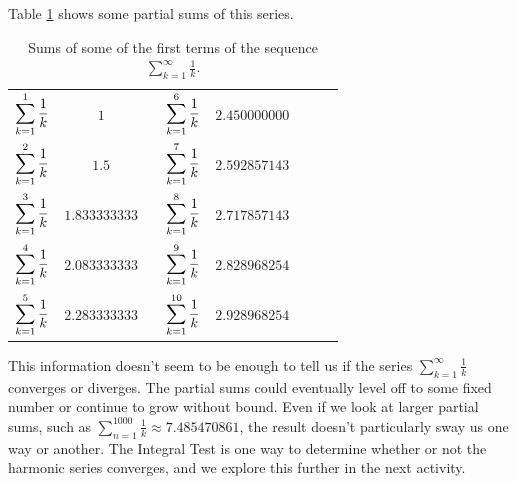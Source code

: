 Table \ref{T:8.3_harmonic} shows some partial sums of this series.
\begin{table}[ht]
\begin{center}
\renewcommand{\arraystretch}{1.5}
\begin{tabular}{c|c p{0.75in} c|c c c|c}
$\displaystyle \sum_{k=1}^{1} \frac{1}{k}$   & $1$                &  &$\displaystyle \sum_{k=1}^{6} \frac{1}{k}$   & $2.450000000$ \\
$\displaystyle \sum_{k=1}^{2} \frac{1}{k}$   & $1.5$              &  &$\displaystyle \sum_{k=1}^{7} \frac{1}{k}$   & $2.592857143$ \\
$\displaystyle \sum_{k=1}^{3} \frac{1}{k}$   & $1.833333333$      &  &$\displaystyle \sum_{k=1}^{8} \frac{1}{k}$   & $2.717857143$ \\
$\displaystyle \sum_{k=1}^{4} \frac{1}{k}$   & $2.083333333$      &  &$\displaystyle \sum_{k=1}^{9} \frac{1}{k}$   & $2.828968254$ \\
$\displaystyle \sum_{k=1}^{5} \frac{1}{k}$   & $2.283333333$      &  &$\displaystyle \sum_{k=1}^{10} \frac{1}{k}$  & $2.928968254$ \\
\end{tabular}
\label{T:8.3_harmonic}
\caption{Sums of some of the first terms of the sequence $\sum_{k=1}^{\infty} \frac{1}{k}$.}
\end{center}
\end{table}
This information doesn't seem to be enough to tell us if the series $ \sum_{k=1}^{\infty} \frac{1}{k}$ converges or diverges. The partial sums could eventually level off to some fixed number or continue to grow without bound. Even if we look at larger partial sums, such as $ \sum_{n=1}^{1000} \frac{1}{k} \approx 7.485470861$, the result doesn't particularly sway us one way or another. The Integral Test is one way to determine whether or not the harmonic series converges, and we explore this further in the next activity.



